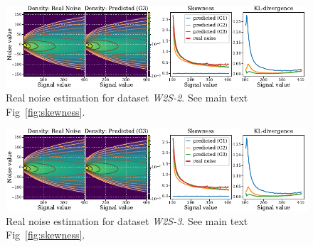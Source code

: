 \documentclass{article}
\begin{document}
\begin{figure}[ht]
\begin{center}
\centerline{\includegraphics[width=\columnwidth]{fig_skewness_1col_w2s-1.pdf}}
\caption{Real noise estimation for dataset \textit{W2S-2}. See main text Fig~\ref{fig:skewness}.
}
\end{center}
\vskip -0.2in
\end{figure}

\begin{figure}[ht]
\begin{center}
\centerline{\includegraphics[width=\columnwidth]{fig_skewness_1col_w2s-1.pdf}}
\caption{Real noise estimation for dataset \textit{W2S-3}. See main text Fig~\ref{fig:skewness}.
}
\end{center}
\vskip -0.2in
\end{figure}

% 
% 
%
\end{document}
